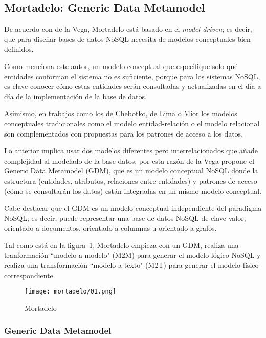 \subsection{Mortadelo: Generic Data Metamodel}
De acuerdo con de la Vega\cite{de_la_vega_mortadelo_2020}, Mortadelo está basado en el \textit{model driven}; es decir, que para diseñar bases de datos NoSQL necesita de modelos conceptuales bien definidos.


Como menciona este autor, un modelo conceptual que especifique solo qué entidades conforman el sistema no es suficiente, porque para los sistemas NoSQL, es clave conocer cómo estas entidades serán consultadas y actualizadas en el día a día de la implementación de la base de datos.


Asimismo, en trabajos como los de Chebotko\cite{chebotko_big_2015}, de Lima\cite{de_lima_workload-driven_2015} o Mior\cite{mior_nose_2017-1} los modelos conceptuales tradicionales como el modelo entidad-relación o el modelo relacional son complementados con propuestas para los patrones de acceso a los datos.


Lo anterior implica usar dos modelos diferentes pero interrelacionados que añade complejidad al modelado de la base datos; por esta razón de la Vega propone el Generic Data Metamodel (GDM), que es un modelo conceptual NoSQL donde la estructura (entidades, atributos, relaciones entre entidades) y patrones de acceso (cómo se consultarán los datos) están integradas en un mismo modelo conceptual.


Cabe destacar que el GDM es un modelo conceptual independiente del paradigma NoSQL; es decir, puede representar una base de datos NoSQL de clave-valor, orientado a documentos, orientado a columnas u orientado a grafos.


Tal como está en la figura~\ref{img:mortadelo-process}, Mortadelo empieza con un GDM, realiza una tranformación ``modelo a modelo" (M2M) para generar el modelo lógico NoSQL y realiza una transformación ``modelo a texto" (M2T) para generar el modelo físico correspondiente.


\begin{figure}[h!t] 
    \centering
    \texttt{[image: mortadelo/01.png]}
    \caption{Mortadelo}
    \label{img:mortadelo-process}
\end{figure}

\subsubsection*{Generic Data Metamodel}

